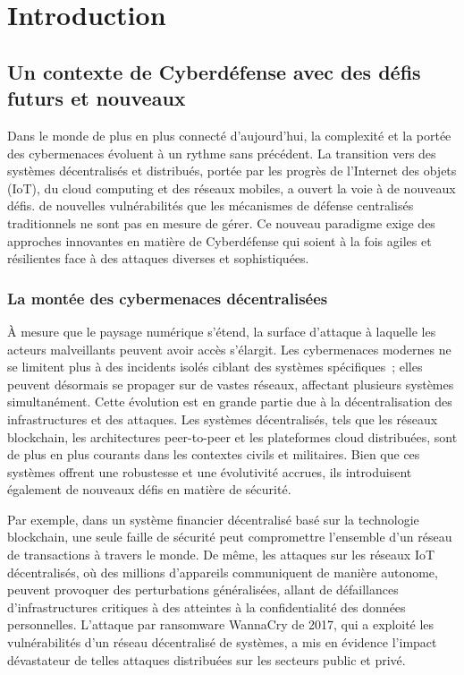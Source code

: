 \chapter{Introduction}\label{ch:introduction}

\section{Un contexte de Cyberdéfense avec des défis futurs et nouveaux}

Dans le monde de plus en plus connecté d'aujourd'hui, la complexité et la portée des cybermenaces évoluent à un rythme sans précédent. La transition vers des systèmes décentralisés et distribués, portée par les progrès de l'Internet des objets (IoT), du cloud computing et des réseaux mobiles, a ouvert la voie à de nouveaux défis. de nouvelles vulnérabilités que les mécanismes de défense centralisés traditionnels ne sont pas en mesure de gérer\cite{sun2014data}. Ce nouveau paradigme exige des approches innovantes en matière de Cyberdéfense qui soient à la fois agiles et résilientes face à des attaques diverses et sophistiquées\cite{taddeo2019trusting}.

\subsection{La montée des cybermenaces décentralisées}

À mesure que le paysage numérique s'étend, la surface d'attaque à laquelle les acteurs malveillants peuvent avoir accès s'élargit. Les cybermenaces modernes ne se limitent plus à des incidents isolés ciblant des systèmes spécifiques~; elles peuvent désormais se propager sur de vastes réseaux, affectant plusieurs systèmes simultanément. Cette évolution est en grande partie due à la décentralisation des infrastructures et des attaques. Les systèmes décentralisés, tels que les réseaux blockchain, les architectures peer-to-peer et les plateformes cloud distribuées, sont de plus en plus courants dans les contextes civils et militaires. Bien que ces systèmes offrent une robustesse et une évolutivité accrues, ils introduisent également de nouveaux défis en matière de sécurité.

Par exemple, dans un système financier décentralisé basé sur la technologie blockchain, une seule faille de sécurité peut compromettre l'ensemble d'un réseau de transactions à travers le monde\cite{li2020survey}. De même, les attaques sur les réseaux IoT décentralisés, où des millions d'appareils communiquent de manière autonome, peuvent provoquer des perturbations généralisées, allant de défaillances d'infrastructures critiques à des atteintes à la confidentialité des données personnelles\cite{sun2014data}. L'attaque par ransomware WannaCry de 2017, qui a exploité les vulnérabilités d'un réseau décentralisé de systèmes, a mis en évidence l'impact dévastateur de telles attaques distribuées sur les secteurs public et privé\cite{mohurle2017wannacry}.

